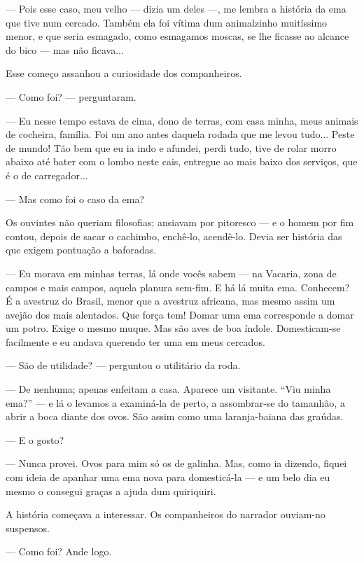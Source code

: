--- Pois esse caso, meu velho --- dizia um deles ---, me lembra a
história da ema que tive num cercado. Também ela foi vítima dum
animalzinho muitíssimo menor, e que seria esmagado, como esmagamos
moscas, se lhe ficasse ao alcance do bico --- mas não ficava...

Esse começo assanhou a curiosidade dos companheiros.

--- Como foi? --- perguntaram.

--- Eu nesse tempo estava de cima, dono de terras, com casa minha, meus
animais de cocheira, família. Foi um ano antes daquela rodada que me
levou tudo... Peste de mundo! Tão bem que eu ia indo e afundei, perdi
tudo, tive de rolar morro abaixo até bater com o lombo neste cais,
entregue ao mais baixo dos serviços, que é o de carregador...

--- Mas como foi o caso da ema?

Os ouvintes não queriam filosofias; ansiavam por pitoresco --- e o homem
por fim contou, depois de sacar o cachimbo, enchê-lo, acendê-lo. Devia
ser história das que exigem pontuação a baforadas.

--- Eu morava em minhas terras, lá onde vocês sabem --- na Vacaria, zona
de campos e mais campos, aquela planura sem-fim. E há lá muita ema.
Conhecem? É a avestruz do Brasil, menor que a avestruz africana, mas
mesmo assim um avejão dos mais alentados. Que força tem! Domar uma ema
corresponde a domar um potro. Exige o mesmo muque. Mas são aves de boa
índole. Domesticam-se facilmente e eu andava querendo ter uma em meus
cercados.

--- São de utilidade? --- perguntou o utilitário da roda.

--- De nenhuma; apenas enfeitam a casa. Aparece um visitante. ``Viu
minha ema?'' --- e lá o levamos a examiná-la de perto, a assombrar-se do
tamanhão, a abrir a boca diante dos ovos. São assim como uma
laranja-baiana das graúdas.

--- E o gosto?

--- Nunca provei. Ovos para mim só os de galinha. Mas, como ia dizendo,
fiquei com ideia de apanhar uma ema nova para domesticá-la --- e um belo
dia eu mesmo o consegui graças a ajuda dum quiriquiri.

A história começava a interessar. Os companheiros do narrador ouviam-no
suspensos.

--- Como foi? Ande logo.

